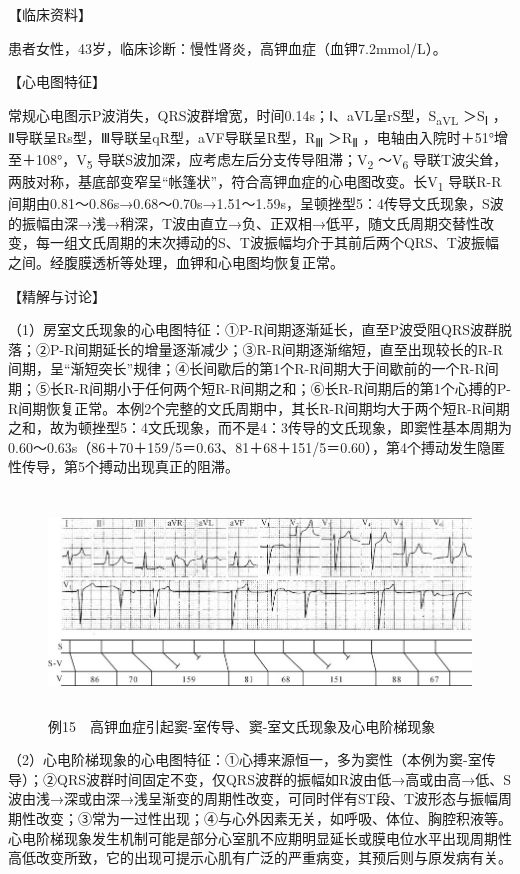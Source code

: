 【临床资料】

患者女性，43岁，临床诊断：慢性肾炎，高钾血症（血钾7.2mmol/L）。

【心电图特征】

常规心电图示P波消失，QRS波群增宽，时间0.14s；Ⅰ、aVL呈rS型，S\textsubscript{aVL}
＞S\textsubscript{Ⅰ}
，Ⅱ导联呈Rs型，Ⅲ导联呈qR型，aVF导联呈R型，R\textsubscript{Ⅲ}
＞R\textsubscript{Ⅱ} ，电轴由入院时＋51°增至＋108°，V\textsubscript{5}
导联S波加深，应考虑左后分支传导阻滞；V\textsubscript{2}
～V\textsubscript{6}
导联T波尖耸，两肢对称，基底部变窄呈“帐篷状”，符合高钾血症的心电图改变。长V\textsubscript{1}
导联R-R间期由0.81～0.86s→0.68～0.70s→1.51～1.59s，呈顿挫型5：4传导文氏现象，S波的振幅由深→浅→稍深，T波由直立→负、正双相→低平，随文氏周期交替性改变，每一组文氏周期的末次搏动的S、T波振幅均介于其前后两个QRS、T波振幅之间。经腹膜透析等处理，血钾和心电图均恢复正常。

【精解与讨论】

（1）房室文氏现象的心电图特征：①P-R间期逐渐延长，直至P波受阻QRS波群脱落；②P-R间期延长的增量逐渐减少；③R-R间期逐渐缩短，直至出现较长的R-R间期，呈“渐短突长”规律；④长间歇后的第1个R-R间期大于间歇前的一个R-R间期；⑤长R-R间期小于任何两个短R-R间期之和；⑥长R-R间期后的第1个心搏的P-R间期恢复正常。本例2个完整的文氏周期中，其长R-R间期均大于两个短R-R间期之和，故为顿挫型5：4文氏现象，而不是4：3传导的文氏现象，即窦性基本周期为0.60～0.63s（86＋70＋159/5＝0.63、81＋68＋151/5＝0.60），第4个搏动发生隐匿性传导，第5个搏动出现真正的阻滞。

\begin{figure}[!htbp]
 \centering
 \includegraphics[width=5.78125in,height=2.30208in]{./images/Image00773.jpg}
 \captionsetup{justification=centering}
 \caption{例15　高钾血症引起窦-室传导、窦-室文氏现象及心电阶梯现象}
 \label{fig50-15}
  \end{figure} 

（2）心电阶梯现象的心电图特征：①心搏来源恒一，多为窦性（本例为窦-室传导）；②QRS波群时间固定不变，仅QRS波群的振幅如R波由低→高或由高→低、S波由浅→深或由深→浅呈渐变的周期性改变，可同时伴有ST段、T波形态与振幅周期性改变；③常为一过性出现；④与心外因素无关，如呼吸、体位、胸腔积液等。心电阶梯现象发生机制可能是部分心室肌不应期明显延长或膜电位水平出现周期性高低改变所致，它的出现可提示心肌有广泛的严重病变，其预后则与原发病有关。

